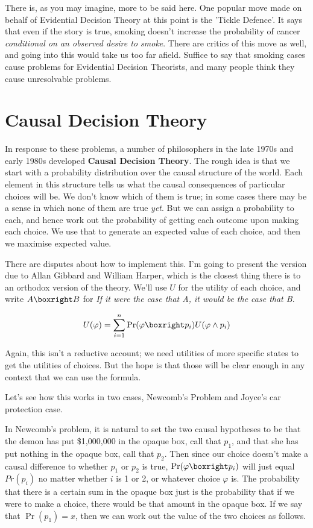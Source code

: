 There is, as you may imagine, more to be said here. One popular move made on behalf of Evidential Decision Theory at this point is the 'Tickle Defence'. It says that even if the story is true, smoking doesn't increase the probability of cancer \textit{conditional on an observed desire to smoke}. There are critics of this move as well, and going into this would take us too far afield. Suffice to say that smoking cases cause problems for Evidential Decision Theorists, and many people think they cause unresolvable problems.

\section{Causal Decision Theory}
In response to these problems, a number of philosophers in the late 1970s and early 1980s developed \textbf{Causal Decision Theory}. The rough idea is that we start with a probability distribution over the causal structure of the world. Each element in this structure tells us what the causal consequences of particular choices will be. We don't know which of them is true; in some cases there may be a sense in which none of them are true \textit{yet}. But we can assign a probability to each, and hence work out the probability of getting each outcome upon making each choice. We use that to generate an expected value of each choice, and then we maximise expected value.

There are disputes about how to implement this. I'm going to present the version due to Allan Gibbard and William Harper, which is the closest thing there is to an orthodox version of the theory. We'll use $U$ for the utility of each choice, and write $A \boxright B$ for \textit{If it were the case that A, it would be the case that B}.

\begin{equation*}
U(\varphi) = \sum_{i=1}^n \Pr(\varphi \boxright p_i) U(\varphi \wedge p_i)
\end{equation*}

\noindent Again, this isn't a reductive account; we need utilities of more specific states to get the utilities of choices. But the hope is that those will be clear enough in any context that we can use the formula.

Let's see how this works in two cases, Newcomb's Problem and Joyce's car protection case.

In Newcomb's problem, it is natural to set the two causal hypotheses to be that the demon has put \$1,000,000 in the opaque box, call that $p_1$, and that she has put nothing in the opaque box, call that $p_2$. Then since our choice doesn't make a causal difference to whether $p_1$ or $p_2$ is true, $\Pr(\varphi \boxright p_i)$ will just equal $Pr(p_i)$ no matter whether $i$ is 1 or 2, or whatever choice $\varphi$ is. The probability that there is a certain sum in the opaque box just is the probability that if we were to make a choice, there would be that amount in the opaque box. If we say that $\Pr(p_1) = x$, then we can work out the value of the two choices as follows.

